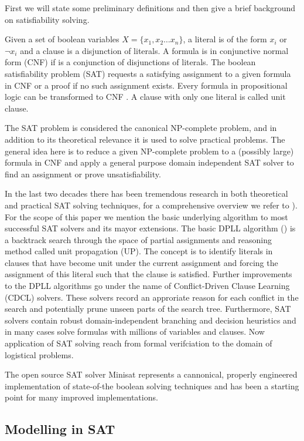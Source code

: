 \documentclass[]{llncs}
\begin{document}
First we will state some preliminary definitions and then give a brief background on satisfiability solving. 

Given a set of boolean variables $X = \{x_1, x_2 \ldots x_n\}$, a literal is of the form $x_i$ or $\neg x_i$ and a
clause is a disjunction of literals. A formula is in conjunctive normal form (CNF) if is a conjunction of disjunctions
of literals. The boolean satisfiability problem (SAT) requests a satisfying assignment to a given formula in CNF or a
proof if no such assignment exists. Every formula in propositional logic can be transformed to CNF \cite{Tseitin83}. A
clause with only one literal is called unit clause. 

The SAT problem is considered the canonical NP-complete problem, and in addition to its theoretical relevance it is
used to solve practical problems. The general idea here is to reduce a given NP-complete problem to a (possibly large)
formula in CNF and apply a general purpose domain independent SAT solver to find an assignment or prove
unsatisfiability. 

In the last two decades there has been tremendous research in both theoretical and practical SAT solving techniques, for
a comprehensive overview we refer to \cite{Biere09}). For the scope of this paper we mention the basic underlying
algorithm to most successful SAT solvers and its mayor extensions. The basic DPLL algorithm (\cite{Putnam60}) is a
 backtrack search through the space of partial assignments and  reasoning method called unit propagation (UP). The concept is to
identify literals in clauses that have become unit under the current assignment and forcing the assignment of this
literal such that the clause is satisfied. Further improvements to the DPLL algorithms go under the name of
Conflict-Driven Clause Learning (CDCL) solvers. These solvers record an approriate reason for each conflict in the
search and potentially prune unseen parts of the search tree. Furthermore, SAT solvers contain robust domain-independent
branching and decision heuristics and in many cases solve formulas with millions of variables and clauses. Now
application of SAT solving reach from formal verifciation to the domain of logistical problems. 

The open source SAT solver Minisat \cite{Een03} represents a cannonical, properly engineered implementation of
state-of-the boolean solving techniques and has been a starting point for many improved implementations. 

\subsection{Modelling in SAT}
\end{document}
